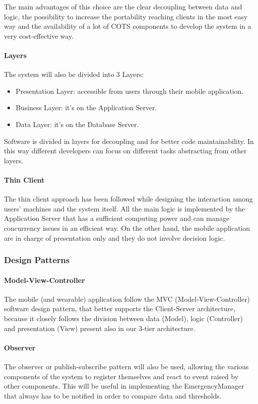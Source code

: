 The main advantages of this choice are the clear decoupling between data and logic, the possibility to increase the portability reaching clients in the most easy way and the availability of a lot of COTS components to  develop the system in a very cost-effective way.

\paragraph*{Layers}
The system will also be divided into 3 Layers:
\begin{itemize}
\item Presentation Layer: accessible from users through their mobile application.
\item Business Layer: it's on the Application Server.
\item Data Layer: it's on the Database Server.
\end{itemize}
Software is divided in layers for decoupling and for better code maintainability. In this way different developers can focus on different tasks abstracting from other layers.

\paragraph*{Thin Client}
The thin client approach has been followed while designing the interaction among users’ machines and the system itself. All the main logic is implemented by the Application Server that has a sufficient computing power and can manage concurrency issues in an efficient way. On the other hand, the mobile application are in charge of presentation only and they do not involve decision logic.

\subsubsection{Design Patterns}
\paragraph*{Model-View-Controller}
The mobile (and wearable) application follow the MVC (Model-View-Controller) software design pattern, that better supports the Client-Server architecture, because it closely follows the division between data (Model), logic (Controller) and presentation (View) present also in our 3-tier architecture.

\paragraph*{Observer}
The observer or publish-subscribe pattern will also be used, allowing the various components of the system to register themselves and react to event raised by other components. This will be useful in implementing the EmergencyManager that always has to be notified in order to compare data and thresholds.


